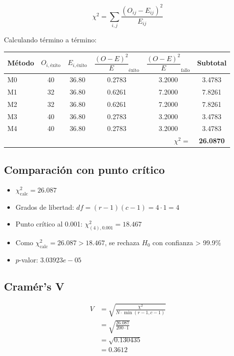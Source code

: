 \documentclass[12pt,a4paper,oneside]{book}
\begin{document}
\begin{equation}
\chi^2 = \sum_{i,j} \frac{(O_{ij} - E_{ij})^2}{E_{ij}}
\end{equation}

Calculando término a término:

\begin{table}[H]
\centering
\renewcommand{\arraystretch}{1.2}
\begin{tabular}{lccccc}
\toprule
\textbf{Método} & $O_{i,\text{éxito}}$ & $E_{i,\text{éxito}}$ & $\dfrac{(O-E)^2}{E}_{\text{éxito}}$ & $\dfrac{(O-E)^2}{E}_{\text{fallo}}$ & Subtotal \\
\midrule
M0 & 40 & 36.80 & 0.2783 & 3.2000 & 3.4783 \\
M1 & 32 & 36.80 & 0.6261 & 7.2000 & 7.8261 \\
M2 & 32 & 36.80 & 0.6261 & 7.2000 & 7.8261 \\
M3 & 40 & 36.80 & 0.2783 & 3.2000 & 3.4783 \\
M4 & 40 & 36.80 & 0.2783 & 3.2000 & 3.4783 \\
\midrule
\multicolumn{5}{r}{$\chi^2 =$} & \textbf{26.0870} \\
\bottomrule
\end{tabular}
\end{table}

\subsection{Comparación con punto crítico}

\begin{itemize}
    \item $\chi^2_{\text{calc}} = 26.087$
    \item Grados de libertad: $df = (r-1)(c-1) = 4 \cdot 1 = 4$
    \item Punto crítico al 0.001: $\chi^2_{(4),0.001} = 18.467$
    \item Como $\chi^2_{\text{calc}} = 26.087 > 18.467$, se rechaza $H_0$ con confianza > 99.9\%
    \item $p$-valor: $3.03923e-05$
\end{itemize}

\subsection{Cramér's V}

\begin{align}
V &= \sqrt{\frac{\chi^2}{N \cdot \min(r-1, c-1)}} \\
  &= \sqrt{\frac{26.087}{200 \cdot 1}} \\
  &= \sqrt{0.130435} \\
  &= \boxed{0.3612}
\end{align}
\end{document}
